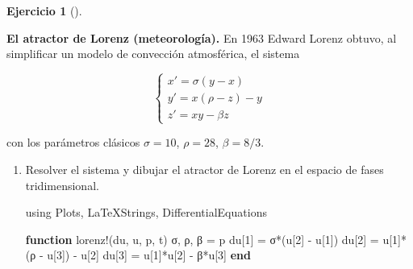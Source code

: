 \documentclass[
  spanish,
  a4paper,
]{scrreport}
\newenvironment{Shaded}{\begin{snugshade}}{\end{snugshade}}
\newcommand{\BuiltInTok}[1]{\textcolor[rgb]{0.00,0.23,0.31}{#1}}
\newcommand{\FloatTok}[1]{\textcolor[rgb]{0.68,0.00,0.00}{#1}}
\newcommand{\FunctionTok}[1]{\textcolor[rgb]{0.28,0.35,0.67}{#1}}
\newcommand{\ImportTok}[1]{\textcolor[rgb]{0.00,0.46,0.62}{#1}}
\newcommand{\KeywordTok}[1]{\textcolor[rgb]{0.00,0.23,0.31}{\textbf{#1}}}
\newcommand{\NormalTok}[1]{\textcolor[rgb]{0.00,0.23,0.31}{#1}}
\newcommand{\OperatorTok}[1]{\textcolor[rgb]{0.37,0.37,0.37}{#1}}
\theoremstyle{definition}
\newtheorem{exercise}{Ejercicio}[chapter]
\theoremstyle{remark}
\begin{document}
\begin{exercise}[]\protect\hypertarget{exr-lorenz}{}\label{exr-lorenz}

\textbf{El atractor de Lorenz (meteorología).} En 1963 Edward Lorenz
obtuvo, al simplificar un modelo de convección atmosférica, el sistema

\[
\begin{cases}
x' = \sigma(y - x) \\
y' = x(\rho - z) - y \\
z' = xy - \beta z
\end{cases}
\]

con los parámetros clásicos \(\sigma = 10\), \(\rho = 28\),
\(\beta = 8/3\).

\begin{enumerate}
\def\labelenumi{\alph{enumi}.}
\item
  Resolver el sistema y dibujar el atractor de Lorenz en el espacio de
  fases tridimensional.

  \begin{tcolorbox}[enhanced jigsaw, arc=.35mm, bottomrule=.15mm, bottomtitle=1mm, breakable, colback=white, colbacktitle=quarto-callout-tip-color!10!white, colframe=quarto-callout-tip-color-frame, coltitle=black, left=2mm, leftrule=.75mm, opacityback=0, opacitybacktitle=0.6, rightrule=.15mm, title=\textcolor{quarto-callout-tip-color}{\faLightbulb}\hspace{0.5em}{Solución}, titlerule=0mm, toprule=.15mm, toptitle=1mm]

\begin{Shaded}
\begin{Highlighting}[]
\ImportTok{using} \BuiltInTok{Plots}\NormalTok{, }\BuiltInTok{LaTeXStrings}\NormalTok{, }\BuiltInTok{DifferentialEquations}

\KeywordTok{function} \FunctionTok{lorenz!}\NormalTok{(du, u, p, t)}
\NormalTok{    σ, ρ, β }\OperatorTok{=}\NormalTok{ p}
\NormalTok{    du[}\FloatTok{1}\NormalTok{] }\OperatorTok{=} \FunctionTok{σ*}\NormalTok{(u[}\FloatTok{2}\NormalTok{] }\OperatorTok{{-}}\NormalTok{ u[}\FloatTok{1}\NormalTok{])}
\NormalTok{    du[}\FloatTok{2}\NormalTok{] }\OperatorTok{=}\NormalTok{ u[}\FloatTok{1}\NormalTok{]}\FunctionTok{*}\NormalTok{(ρ }\OperatorTok{{-}}\NormalTok{ u[}\FloatTok{3}\NormalTok{]) }\OperatorTok{{-}}\NormalTok{ u[}\FloatTok{2}\NormalTok{]}
\NormalTok{    du[}\FloatTok{3}\NormalTok{] }\OperatorTok{=}\NormalTok{ u[}\FloatTok{1}\NormalTok{]}\OperatorTok{*}\NormalTok{u[}\FloatTok{2}\NormalTok{] }\OperatorTok{{-}}\NormalTok{ β}\OperatorTok{*}\NormalTok{u[}\FloatTok{3}\NormalTok{]}
\KeywordTok{end}


\end{Highlighting}
\end{Shaded}
\end{tcolorbox}
\end{enumerate}
\end{exercise}
\end{document}
